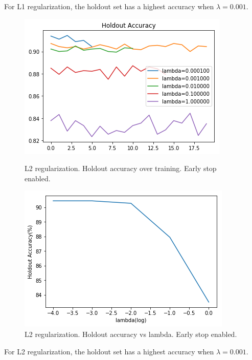 \documentclass{article}
\begin{document}
For L1 regularization, the holdout set has a highest accuracy when $\lambda=0.001$.
\begin{figure}[h]
	\begin{minipage}{0.48\textwidth}
		\centering
		\includegraphics[width=\textwidth]{pics/softmax_reg_3.png}
		\caption{L2 regularization. Holdout  accuracy over training. Early stop enabled.}
	\end{minipage}\hfill
	\begin {minipage}{0.48\textwidth}
	\centering
	\includegraphics[width=\textwidth]{pics/softmax_reg_4.png}
	\caption{L2 regularization. Holdout accuracy vs lambda. Early stop enabled.}
\end{minipage}
\end{figure}
For L2 regularization, the holdout set has a highest accuracy when $\lambda=0.001$.
\end{document}
